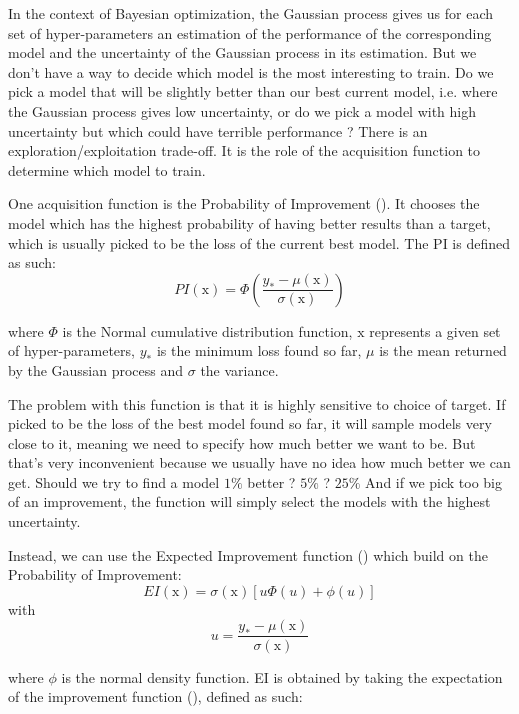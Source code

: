 In the context of Bayesian optimization, the Gaussian process gives us for each set of hyper-parameters an estimation of the performance of the corresponding model and the uncertainty of the Gaussian process in its estimation. But we don't have a way to decide which model is the most interesting to train. Do we pick a model that will be slightly better than our best current model, i.e. where the Gaussian process gives low uncertainty, or do we pick a model with high uncertainty but which could have terrible performance ? There is an exploration/exploitation trade-off. It is the role of the acquisition function to determine which model to train.

One acquisition function is the Probability of Improvement (\textcite{kushner1964}). It chooses the model which has the highest probability of having better results than a target, which is usually picked to be the loss of the current best model. The PI is defined as such:
\begin{equation}
    PI(\mathrm{x}) = \Phi \left( \frac{y_* - \mu(\mathrm{x})}{\sigma(\mathrm{x})}\right)
\end{equation}

where $\Phi$ is the Normal cumulative distribution function, $\mathrm{x}$ represents a given set of hyper-parameters, $y_*$ is the minimum loss found so far, $\mu$ is the mean returned by the Gaussian process and $\sigma$ the variance.

The problem with this function is that it is highly sensitive to choice of target. If picked to be the loss of the best model found so far, it will sample models very close to it, meaning we need to specify how much better we want to be. But that's very inconvenient because we usually have no idea how much better we can get. Should we try to find a model $1 \%$ better ? $5 \%$ ? $25 \%$ And if we pick too big of an improvement, the function will simply select the models with the highest uncertainty.

Instead, we can use the Expected Improvement function (\textcite{schonlau1998}) which build on the Probability of Improvement:
\begin{equation}
	EI(\mathrm{x})  = \sigma (\mathrm{x}) [u\Phi(u)+\phi(u)]
\end{equation}
with
\begin{equation}
	u = \frac{y_* - \mu(\mathrm{x})}{\sigma(\mathrm{x})}
\end{equation}

where $\phi$ is the normal density function. EI is obtained by taking the expectation of the improvement function (\textcite{shahriari2016IEEE}), defined as such:

